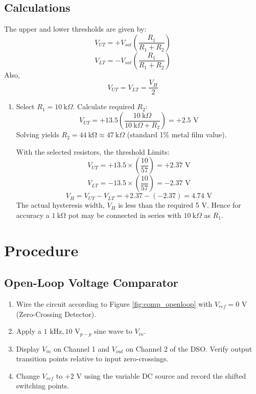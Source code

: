\subsection{Calculations}
The upper and lower thresholds are given by:
\[
		V_{UT} = +V_{sat} \left( \frac{R_1}{R_1 + R_2} \right)
\]
\[
V_{LT} = -V_{sat} \left( \frac{R_1}{R_1 + R_2} \right)
\]
Also,
\[
V_{UT}=V_{LT} = \dfrac{V_H}{2}
\]
\begin{enumerate}
	\item Select $R_1 = \SI{10}{\kilo\Omega}$. Calculate required $R_2$:
\begin{equation}
	V_{UT} = +13.5 \left( \frac{\SI{10}{\kilo\Omega}}{\SI{10}{\kilo\Omega} + R_2} \right) = +2.5\text{ V}
\end{equation}
Solving yields $R_2 =\SI{44}{\kilo\ohm}\approx \SI{47}{\kilo\Omega}$ (standard 1\% metal film value).

With the selected resistors, the threshold Limits:
\begin{equation}
	V_{UT} = +13.5 \times \left( \frac{10}{57} \right) = +2.37\text{ V}
\end{equation}
\begin{equation}
	V_{LT} = -13.5 \times \left( \frac{10}{57} \right) = -2.37\text{ V}
\end{equation}
\begin{equation}
	V_H = V_{UT} - V_{LT} = +2.37 - (-2.37) = 4.74\text{ V}
\end{equation}
The actual hysteresis width, $V_H$ is less than the required 5 V. Hence for accuracy a $\SI{1}{\kilo\ohm}$ pot may be connected in series with $\SI{10}{\kilo\Omega}$ as $R_1$.
\end{enumerate}

\section{Procedure}
\subsection{Open-Loop Voltage Comparator}
\begin{enumerate}
\item Wire the circuit according to Figure \ref{fig:comp_openloop} with $V_{ref} = 0\text{ V}$ (Zero-Crossing Detector).
\item Apply a $1\text{ kHz}, 10\text{ V}_{p-p}$ sine wave to $V_{in}$.
\item Display $V_{in}$ on Channel 1 and $V_{out}$ on Channel 2 of the DSO. Verify output transition points relative to input zero-crossings.
\item Change $V_{ref}$ to $+2\text{ V}$ using the variable DC source and record the shifted switching points.
\end{enumerate}

